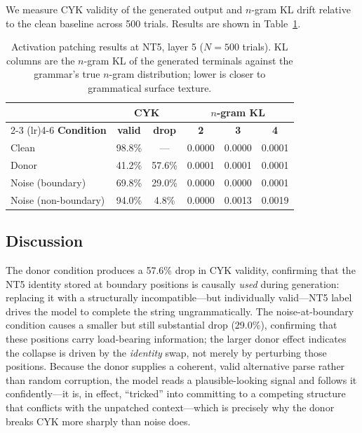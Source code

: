 \documentclass[10pt,twocolumn]{article}
\begin{document}
We measure CYK validity of the generated output and $n$-gram KL drift relative to the clean baseline across 500 trials. Results are shown in Table~\ref{tab:patching}.

\begin{table}[h]
\centering
\caption{Activation patching results at NT5, layer 5 ($N{=}500$ trials). KL columns are the $n$-gram KL of the generated terminals against the grammar's true $n$-gram distribution; lower is closer to grammatical surface texture.}
\label{tab:patching}
\setlength{\tabcolsep}{3.5pt}
\footnotesize
\begin{tabular}{lcc ccc}
\toprule
& \multicolumn{2}{c}{\textbf{CYK}} & \multicolumn{3}{c}{\textbf{$n$-gram KL}} \\
\cmidrule(lr){2-3} \cmidrule(lr){4-6}
\textbf{Condition} & \textbf{valid} & \textbf{drop} & \textbf{2} & \textbf{3} & \textbf{4} \\
\midrule
Clean                & 98.8\% & ---    & 0.0000 & 0.0000 & 0.0001 \\
Donor                & 41.2\% & 57.6\% & 0.0001 & 0.0001 & 0.0001 \\
Noise (boundary)     & 69.8\% & 29.0\% & 0.0000 & 0.0000 & 0.0001 \\
Noise (non-boundary) & 94.0\% & 4.8\%  & 0.0000 & 0.0013 & 0.0019 \\
\bottomrule
\end{tabular}
\end{table}

\subsection{Discussion}

The donor condition produces a 57.6\% drop in CYK validity, confirming that the NT5 identity stored at boundary positions is causally \emph{used} during generation: replacing it with a structurally incompatible---but individually valid---NT5 label drives the model to complete the string ungrammatically. The noise-at-boundary condition causes a smaller but still substantial drop (29.0\%), confirming that these positions carry load-bearing information; the larger donor effect indicates the collapse is driven by the \emph{identity} swap, not merely by perturbing those positions. Because the donor supplies a coherent, valid alternative parse rather than random corruption, the model reads a plausible-looking signal and follows it confidently---it is, in effect, ``tricked'' into committing to a competing structure that conflicts with the unpatched context---which is precisely why the donor breaks CYK more sharply than noise does.
\end{document}
